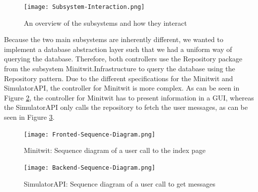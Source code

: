 \begin{figure}[H]
    \begin{center}
        \texttt{[image: Subsystem-Interaction.png]}
    \end{center}
    \caption{An overview of the subsystems and how they interact}
    \label{fig:subsystem-interaction}
\end{figure}

Because the two main subsystems are inherently different, we wanted to implement a database abstraction layer such that we had a uniform way of querying the database. Therefore, both controllers use the Repository package from the subsystem Minitwit.Infrastructure to query the database using the Repository pattern\cite{repo_pattern}.
Due to the different specifications for the Minitwit and SimulatorAPI, the controller for Minitwit is more complex. As can be seen in Figure \ref{fig:frontend-interaction}, the controller for Minitwit has to present information in a GUI, whereas the SimulatorAPI only calls the repository to fetch the user messages, as can be seen in Figure \ref{fig:backend-interaction}.
\begin{figure}[H]
    \begin{center}
        \texttt{[image: Fronted-Sequence-Diagram.png]}
    \end{center}
    \caption{Minitwit: Sequence diagram of a user call to the index page}
    \label{fig:frontend-interaction}
\end{figure}
\begin{figure}[H]
    \begin{center}
        \texttt{[image: Backend-Sequence-Diagram.png]}
    \end{center}
    \caption{SimulatorAPI: Sequence diagram of a user call to get messages}
    \label{fig:backend-interaction}
\end{figure}



